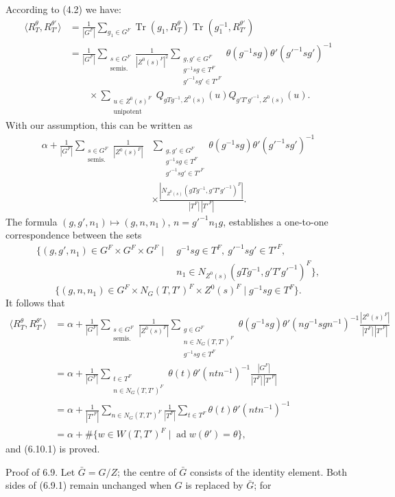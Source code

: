 \documentclass[9pt,twoside]{extarticle}
\begin{document}
{According to (4.2) we have: \[
\begin{aligned}
\langle R_T^\theta,R_{T'}^{\theta'}\rangle
&=\frac1{|G^F|}\sum_{g_1\in G^F}\operatorname{Tr}(g_1,R_T^\theta)\operatorname{Tr}(g_1^{-1},R_{T'}^{\theta'})\\
&=\frac1{|G^F|}\sum_{\substack{s\in G^F\\\text{semis.}}}\frac1{|Z^0(s)^F|^2}
\sum_{\substack{g,g'\in G^F\\g^{-1}sg\in T^F\\g'^{-1}sg'\in T'^F}}
\theta(g^{-1}sg)\theta'(g'^{-1}sg')^{-1}\\
&\qquad\times
\sum_{\substack{u\in Z^0(s)^F\\\text{unipotent}}}
Q_{gTg^{-1},Z^0(s)}(u)Q_{g'T'g'^{-1},Z^0(s)}(u).
\end{aligned}
\] With our assumption, this can be written as \[
\begin{aligned}
\alpha+\frac1{|G^F|}\sum_{\substack{s\in G^F\\\text{semis.}}}\frac1{|Z^0(s)^F|}
&\sum_{\substack{g,g'\in G^F\\g^{-1}sg\in T^F\\g'^{-1}sg'\in T'^F}}
\theta(g^{-1}sg)\theta'(g'^{-1}sg')^{-1}\\
&\times
\frac{|N_{Z^0(s)}(gTg^{-1},g'T'g'^{-1})^F|}{|T^F|\,|T'^F|}.
\end{aligned}
\] The formula \((g,g',n_1)\longmapsto(g,n,n_1)\), \(n=g'^{-1}n_1g\), establishes a one-to-one correspondence between the sets \[
\begin{aligned}
\{(g,g',n_1)\in G^F\times G^F\times G^F\mid
&\ g^{-1}sg\in T^F,\ g'^{-1}sg'\in T'^F,\\
&\ n_1\in N_{Z^0(s)}(gTg^{-1},g'T'g'^{-1})^F\},
\end{aligned}
\]  \[
\{(g,n,n_1)\in G^F\times N_G(T,T')^F\times Z^0(s)^F\mid g^{-1}sg\in T^F\}.
\] It follows that \[
\begin{aligned}
\langle R_T^\theta,R_{T'}^{\theta'}\rangle
&=\alpha+\frac1{|G^F|}\sum_{\substack{s\in G^F\\\text{semis.}}}\frac1{|Z^0(s)^F|}
\sum_{\substack{g\in G^F\\n\in N_G(T,T')^F\\g^{-1}sg\in T^F}}
\theta(g^{-1}sg)\theta'(ng^{-1}sgn^{-1})^{-1}
\frac{|Z^0(s)^F|}{|T^F|\,|T'^F|}\\
&=\alpha+\frac1{|G^F|}\sum_{\substack{t\in T^F\\n\in N_G(T,T')^F}}
\theta(t)\theta'(ntn^{-1})^{-1}
\frac{|G^F|}{|T^F|\,|T'^F|}\\
&=\alpha+\frac1{|T'^F|}\sum_{n\in N_G(T,T')^F}\frac1{|T^F|}
\sum_{t\in T^F}\theta(t)\theta'(ntn^{-1})^{-1}\\
&=\alpha+\#\{w\in W(T,T')^F\mid \operatorname{ad}w(\theta')=\theta\},
\end{aligned}
\] and (6.10.1) is proved.\par

Proof of 6.9. Let \(\bar G=G/Z\); the centre of \(\bar G\) consists of the identity element. Both sides of (6.9.1) remain unchanged when \(G\) is replaced by \(\bar G\); for\par
}
\end{document}
